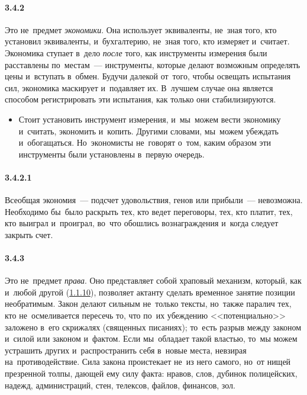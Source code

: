 \paragraph{3.4.2}\hypertarget{par:3.4.2}{} Это не~предмет {\itshape экономики}. Она использует эквиваленты, не~зная того, кто установил эквиваленты, и~бухгалтерию, не~зная того, кто измеряет и~считает. Экономика ступает в~дело {\itshape после} того, как инструменты измерения были расставлены по~местам~--- инструменты, которые делают возможным определять цены и~вступать в~обмен. Будучи далекой от~того, чтобы освещать испытания сил, экономика маскирует и~подавляет их. В~лучшем случае она является способом регистрировать эти испытания, как только они стабилизируются.
	\begin{itemize}
	\item 
	Стоит установить инструмент измерения, и~мы~можем вести экономику и~считать, экономить и~копить. Другими словами, мы~можем убеждать и~обогащаться. Но~экономисты не~говорят о~том, каким образом эти инструменты были установлены в~первую очередь.
	\end{itemize}

\paragraph{3.4.2.1}\hypertarget{par:3.4.2.1}{} Всеобщая экономия~--- подсчет удовольствия, генов или прибыли~--- невозможна. Необходимо бы~было раскрыть тех, кто ведет переговоры, тех, кто платит, тех, кто выиграл и~проиграл, во~что обошлись вознаграждения и~когда следует закрыть счет. 

\paragraph{3.4.3}\hypertarget{par:3.4.3}{} Это не~предмет {\itshape права}. Оно представляет собой храповый механизм, который, как и~любой другой (\hyperlink{par:1.1.10}{1.1.10}), позволяет актанту сделать временное занятие позиции необратимым. Закон делают сильным не~только тексты, но~также паралич тех, кто не~осмеливается пересечь то, что по~их убеждению <<потенциально>> заложено в~его скрижалях (священных писаниях); то~есть разрыв между законом и~силой или законом и~фактом. Если мы~обладает такой властью, то~мы можем устрашить других и~распространить себя в~новые места, невзирая на~противодействие. Сила закона проистекает не~из него самого, но~от нищей презренной толпы, дающей ему силу факта: нравов, слов, дубинок полицейских, надежд, администраций, стен, телексов, файлов, финансов, зол.

